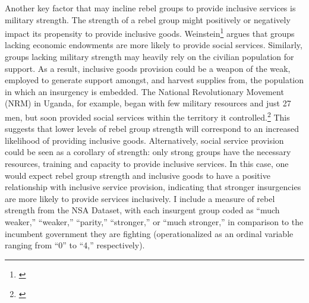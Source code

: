 \documentclass[12pt, letterpaper]{article}
\begin{document}
Another key factor that may incline rebel groups to provide inclusive services is military strength. The strength of a rebel group might positively or negatively impact its propensity to provide inclusive goods. Weinstein\footnote{\citealt{weinstein2006inside}} argues that groups lacking economic endowments are more likely to provide social services. Similarly, groups lacking military strength may heavily rely on the civilian population for support. As a result, inclusive goods provision could be a weapon of the weak, employed to generate support amongst, and harvest supplies from, the population in which an insurgency is embedded. The National Revolutionary Movement (NRM) in Uganda, for example, began with few military resources and just 27 men, but soon provided social services within the territory it controlled.\footnote{\citealt[68]{weinstein2006inside}} This suggests that lower levels of rebel group strength will correspond to an increased likelihood of providing inclusive goods. Alternatively, social service provision could be seen as a corollary of strength: only strong groups have the necessary resources, training and capacity to provide inclusive services. In this case, one would expect rebel group strength and inclusive goods to have a positive relationship with inclusive service provision, indicating that stronger insurgencies are more likely to provide services inclusively. I include a measure of rebel strength from the NSA Dataset, with each insurgent group coded as ``much weaker,'' ``weaker,'' ``parity,'' ``stronger,'' or ``much stronger,'' in comparison to the incumbent government they are fighting (operationalized as an ordinal variable ranging from ``0'' to ``4,'' respectively). 


\end{document}
